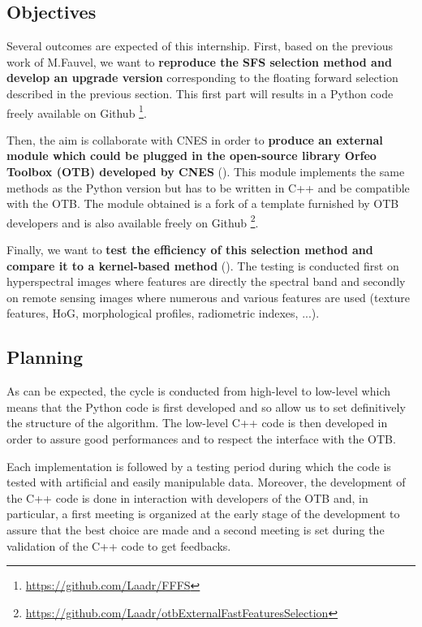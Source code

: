 \documentclass[a4paper,11pt,DIV=16]{scrartcl}
\begin{document}
    \subsection{Objectives}

    Several outcomes are expected of this internship. First, based on the previous work \cite{fauvel2015fast} of M.Fauvel, we want to {\bfseries reproduce the SFS selection method and develop an upgrade version} corresponding to the floating forward selection described in the previous section. This first part will results in a Python code freely available on Github \footnote{\url{https://github.com/Laadr/FFFS}}.

    Then, the aim is collaborate with CNES in order to {\bfseries produce an external module which could be plugged in the open-source library Orfeo Toolbox (OTB) developed by CNES} (\cite{christophe2008orfeo}). This module implements the same methods as the Python version but has to be written in C++ and be compatible with the OTB. The module obtained is a fork of a template furnished by OTB developers and is also available freely on Github \footnote{\url{https://github.com/Laadr/otbExternalFastFeaturesSelection}}.

    Finally, we want to {\bfseries test the efficiency of this selection method and compare it to a kernel-based method} (\cite{camps2010remote}). The testing is conducted first on hyperspectral images where features are directly the spectral band and secondly on remote sensing images where numerous and various features are used (texture features, HoG, morphological profiles, radiometric indexes, ...).

    \subsection{Planning}

    As can be expected, the cycle is conducted from high-level to low-level which means that the Python code is first developed and so allow us to set definitively the structure of the algorithm. The low-level C++ code is then developed in order to assure good performances and to respect the interface with the OTB.

    Each implementation is followed by a testing period during which the code is tested with artificial and easily manipulable data. Moreover, the development of the C++ code is done in interaction with developers of the OTB and, in particular, a first meeting is organized at the early stage of the development to assure that the best choice are made and a second meeting is set during the validation of the C++ code to get feedbacks.
\end{document}
